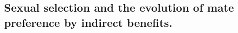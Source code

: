 









\subsection{Sexual selection and the evolution of mate preference by indirect benefits. }


